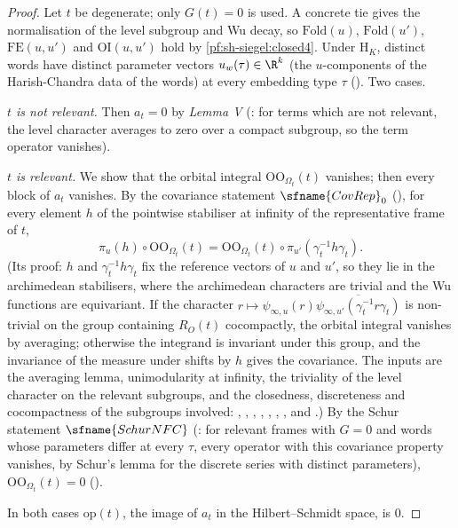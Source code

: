 \begin{proof}
Let $t$ be degenerate; only $G(t)=0$ is used. A concrete tie gives the normalisation of the level subgroup and Wu decay, so
$\mathrm{Fold}(u)$, $\mathrm{Fold}(u')$, $\mathrm{FE}(u,u')$ and $\mathrm{OI}(u,u')$ hold by \cref{pf:sh-siegel:closed4}.
Under $\mathrm{H}_K$, distinct words have distinct parameter vectors $u_w(\tau)\in\R^k$ (the $u$-components of the
Harish-Chandra data of the words) at every embedding type $\tau$
(). Two cases.

\emph{$t$ is not relevant.} Then $a_t=0$ by \emph{Lemma V} (: for terms which are
not relevant, the level character averages to zero over a compact subgroup, so the term operator vanishes).

\emph{$t$ is relevant.} We show that the orbital integral $\mathrm{OO}_{\Omega_t}(t)$ vanishes; then every block of $a_t$
vanishes. By the covariance statement $\sfname{CovRep}_0$ (),
for every element $h$ of the pointwise stabiliser at infinity of the representative frame of $t$,
\[
\pi_u(h)\circ\mathrm{OO}_{\Omega_t}(t)=\mathrm{OO}_{\Omega_t}(t)\circ\pi_{u'}(\gamma_t^{-1}h\gamma_t).
\]
(Its proof: $h$ and $\gamma_t^{-1}h\gamma_t$ fix the reference vectors of $u$ and $u'$, so they lie in the archimedean
stabilisers, where the archimedean characters are trivial and the Wu functions are equivariant. If the character
$r\mapsto\psi_{\infty,u}(r)\overline{\psi_{\infty,u'}(\gamma_t^{-1}r\gamma_t)}$ is non-trivial on the group containing
$R_O(t)$ cocompactly, the orbital integral vanishes by averaging; otherwise the integrand is invariant under this group, and
the invariance of the measure under shifts by $h$ gives the covariance. The inputs are the averaging lemma, unimodularity at
infinity, the triviality of the level character on the relevant subgroups, and the closedness, discreteness and
cocompactness of the subgroups involved:
, , , , , , , and .)
By the Schur statement $\sfname{SchurNFC}$ (: for relevant frames with $G=0$ and words whose
parameters differ at every $\tau$, every operator with this covariance property vanishes, by Schur's lemma for the discrete
series with distinct parameters), $\mathrm{OO}_{\Omega_t}(t)=0$
().

In both cases $\mathrm{op}(t)$, the image of $a_t$ in the Hilbert--Schmidt space, is $0$.
\end{proof}

